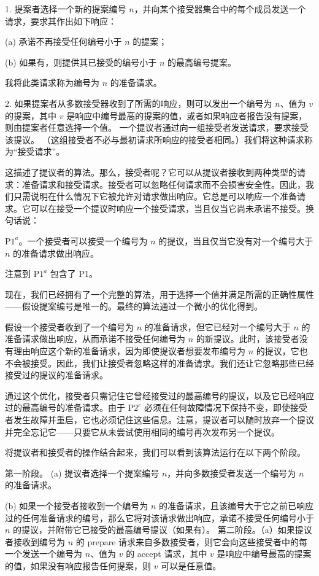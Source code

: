 \documentclass[12pt,a4paper]{report} %
\begin{document}
1. 提案者选择一个新的提案编号 $n$，并向某个接受器集合中的每个成员发送一个请求，要求其作出如下响应：

(a) 承诺不再接受任何编号小于 $n$ 的提案；

(b) 如果有，则提供其已接受的编号小于 $n$ 的最高编号提案。

我将此类请求称为编号为 $n$ 的准备请求。

2. 如果提案者从多数接受器收到了所需的响应，则可以发出一个编号为 $n$、值为 $v$ 的提案，其中 $v$ 是响应中编号最高的提案的值，或者如果响应者报告没有提案，则由提案者任意选择一个值。
一个提议者通过向一组接受者发送请求，要求接受该提议。 （这组接受者不必与最初请求所响应的接受者相同。）我们将这种请求称为“接受请求”。

这描述了提议者的算法。那么，接受者呢？它可以从提议者接收到两种类型的请求：准备请求和接受请求。接受者可以忽略任何请求而不会损害安全性。因此，我们只需说明在什么情况下它被允许对请求做出响应。它总是可以响应一个准备请求。它可以在接受一个提议时响应一个接受请求，当且仅当它尚未承诺不接受。换句话说：

$\mathrm{P} 1^{a}$。一个接受者可以接受一个编号为 $n$ 的提议，当且仅当它没有对一个编号大于 $n$ 的准备请求做出响应。

注意到 $\mathrm{P} 1^{a}$ 包含了 P1。

现在，我们已经拥有了一个完整的算法，用于选择一个值并满足所需的正确性属性——假设提案编号是唯一的。最终的算法通过一个微小的优化得到。

假设一个接受者收到了一个编号为 $n$ 的准备请求，但它已经对一个编号大于 $n$ 的准备请求做出响应，从而承诺不接受任何编号为 $n$ 的新提议。此时，该接受者没有理由响应这个新的准备请求，因为即使提议者想要发布编号为 $n$ 的提议，它也不会被接受。因此，我们让接受者忽略这样的准备请求。我们还让它忽略那些已经接受过的提议的准备请求。

通过这个优化，接受者只需记住它曾经接受过的最高编号的提议，以及它已经响应过的最高编号的准备请求。由于 $\mathrm{P} 2^{c}$ 必须在任何故障情况下保持不变，即使接受者发生故障并重启，它也必须记住这些信息。注意，提议者可以随时放弃一个提议并完全忘记它——只要它从未尝试使用相同的编号再次发布另一个提议。

将提议者和接受者的操作结合起来，我们可以看到该算法运行在以下两个阶段。

第一阶段。 (a) 提议者选择一个提案编号 $n$，并向多数接受者发送一个编号为 $n$ 的准备请求。

(b) 如果一个接受者接收到一个编号为 $n$ 的准备请求，且该编号大于它之前已响应过的任何准备请求的编号，那么它将对该请求做出响应，承诺不接受任何编号小于 $n$ 的提议，并附带它已接受的最高编号提议（如果有）。
第二阶段。（a）如果提议者接收到编号为 $n$ 的 prepare 请求来自多数接受者，则它会向这些接受者中的每一个发送一个编号为 $n$、值为 $v$ 的 accept 请求，其中 $v$ 是响应中编号最高的提案的值，如果没有响应报告任何提案，则 $v$ 可以是任意值。
\end{document}
